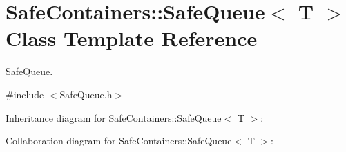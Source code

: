 \hypertarget{classSafeContainers_1_1SafeQueue}{}\section{Safe\+Containers\+::Safe\+Queue$<$ T $>$ Class Template Reference}
\label{classSafeContainers_1_1SafeQueue}


\mbox{\hyperlink{classSafeContainers_1_1SafeQueue}{Safe\+Queue}}.  




{\ttfamily \#include $<$Safe\+Queue.\+h$>$}



Inheritance diagram for Safe\+Containers\+::Safe\+Queue$<$ T $>$\+:


Collaboration diagram for Safe\+Containers\+::Safe\+Queue$<$ T $>$\+:
